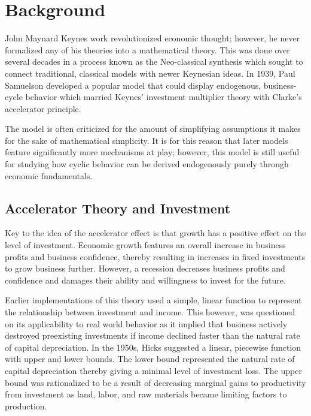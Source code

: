 \section{Background}
John Maynard Keynes work revolutionized economic thought; however, he never formalized any of his theories into a mathematical theory. This was done over several decades in a process known as the Neo-classical synthesis which sought to connect traditional, classical models with newer Keynesian ideas\autocite{Fazzari1989}. In 1939, Paul Samuelson developed a popular model that could display endogenous, business-cycle behavior which married Keynes' investment multiplier theory with Clarke's accelerator principle\autocite{Puu2003,Press1939}.

The model is often criticized for the amount of simplifying assumptions it makes for the sake of mathematical simplicity. It is for this reason that later models feature significantly more mechanisms at play; however, this model is still useful for studying how cyclic behavior can be derived endogenously purely through economic fundamentals.
\subsection{Accelerator Theory and Investment}
Key to the idea of the accelerator effect is that growth has a positive effect on the level of investment. Economic growth features an overall increase in business profits and business confidence, thereby resulting in increases in fixed investments to grow business further. However, a recession decreases business profits and confidence and damages their ability and willingness to invest for the future. 

Earlier implementations of this theory used a simple, linear function to represent the relationship between investment and income. This however, was questioned on its applicability to real world behavior as it implied that business actively destroyed preexisting investments if income declined faster than the natural rate of capital depreciation. In the 1950s, Hicks suggested a linear, piecewise function with upper and lower bounds\autocite{Puu2003}. The lower bound represented the natural rate of capital depreciation thereby giving a minimal level of investment loss. The upper bound was rationalized to be a result of decreasing marginal gains to productivity from investment as land, labor, and raw materials became limiting factors to production. 

